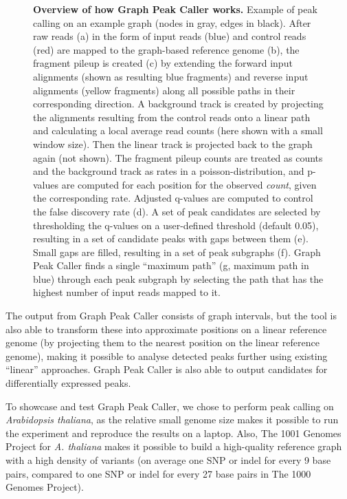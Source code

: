\documentclass[10pt,letterpaper]{article}
\begin{document}
\begin{figure}
\begin{minipage}[c]{0.5\textwidth}
    \caption{{\bf Overview of how Graph Peak Caller works.} Example of peak calling on an example graph (nodes in gray, edges in black). After raw reads (a) in the form of input reads (blue) and control reads (red) are mapped to the graph-based reference genome (b), the fragment pileup is created (c) by extending the forward input alignments (shown as resulting blue fragments) and reverse input alignments (yellow fragments) along all possible paths in their corresponding direction. A background track is created by projecting the alignments resulting from the control reads onto a linear path and calculating a local average  read counts (here shown with a small window size). Then the linear track is projected back to the graph again (not shown). The fragment pileup counts are treated as counts and the background track as rates in a poisson-distribution, and p-values are computed for each position for the observed \emph{count}, given the corresponding rate. Adjusted q-values are computed to control the false discovery rate (d). A set of peak candidates are selected by thresholding the q-values on a user-defined threshold (default 0.05), resulting in a set of candidate peaks with gaps between them (e). Small gaps are filled, resulting in a set of peak subgraphs (f). Graph Peak Caller finds a single “maximum path” (g, maximum path in blue) through each peak subgraph by selecting the path that has the highest number of input reads mapped to it. }
  \end{minipage}
\end{figure}

The output from Graph Peak Caller consists of graph intervals, but the tool is also able to transform these into approximate positions on a linear reference genome (by projecting them to the nearest position on the linear reference genome), making it possible to analyse detected peaks further using existing “linear” approaches. Graph Peak Caller is also able to output candidates for differentially expressed peaks.

To showcase and test Graph Peak Caller, we chose to perform peak calling on \emph{Arabidopsis thaliana}, as the relative small genome size makes it possible to run the experiment and reproduce the results on a laptop. Also, The 1001 Genomes Project for \emph{A. thaliana} makes it possible to build a high-quality reference graph with a high density of variants (on average one SNP or indel for every 9 base pairs, compared to one SNP or indel for every 27 base pairs in The 1000 Genomes Project). 
\end{document}
